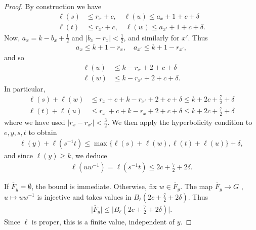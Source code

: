 \documentclass[10pt,a4paper]{amsart}
\begin{document}
\begin{proof}
    By construction we have
    \begin{align*}
        \ell(s) &\leq r_{x} +c, \quad \ell(u) \leq a_x + 1 +c +\delta \\
        \ell(t) &\leq r_{x'} + c, \quad \ell(w) \leq a_{x'} +1+c+\delta.
    \end{align*}
    Now, $a_x = k - b_x + \frac{1}{2}$ and $|b_x - r_x | < \frac{1}{2}$, and similarly for $x'$. Thus
    \begin{align*}
        a_x \leq k+1 - r_x , \quad a_{x'} \leq k+1 - r_{x'},
    \end{align*}
    and so 
    \begin{align*}
        \ell(u) &\leq k-r_x +2+c+\delta \\ 
        \ell(w) &\leq k-r_{x'} +2 +c +\delta.
    \end{align*}
    In particular,
    \begin{align*}
        \ell(s) + \ell(w) &\leq r_x + c + k - r_{x'} +2 +c +\delta \leq k + 2c + \frac{7}{2} + \delta \\
        \ell(t) + \ell(u) &\leq r_{x'} + c + k - r_{x} +2+c+\delta \leq k + 2c  + \frac{7}{2} + \delta
    \end{align*}
    where we have used $|r_x - r_{x'}| < \frac{3}{2}$. 
    We then apply the hyperbolicity condition to $e,y,s,t$ to obtain
    \begin{align*}
        \ell(y) + \ell(s^{-1}t) \leq \max \{ \ell(s) + \ell(w), \ell(t) + \ell(u) \} +\delta ,
    \end{align*}
    and since $\ell(y) \geq k$, we deduce
    \begin{align*}
        \ell(u w^{-1}) = \ell(s^{-1}t) \leq 2c  + \frac{7}{2} + 2\delta.
    \end{align*}

    If $\overline{F}_y = \emptyset$, the bound is immediate. Otherwise,
    fix $w \in \overline{F}_y$. The map $\overline{F}_y \to G$ , $u \mapsto uw^{-1}$
    is injective and takes values in $B_\ell(2c +\frac{7}{2} + 2\delta )$. Thus
    \begin{align*}
        \vert \overline{F}_y \vert \leq | B_\ell(2c +\frac{7}{2} + 2\delta ) \vert.
    \end{align*}
    Since $\ell$ is proper, this is a finite value, independent of $y$. 


\end{proof}
\end{document}
